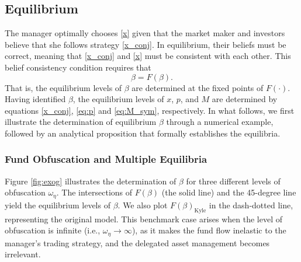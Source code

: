 \subsection{Equilibrium} \label{ss:equilibrium}
The manager optimally chooses \eqref{x} given that the market maker and investors believe that she follows strategy \eqref{x_conj}. In equilibrium, their beliefs must be correct, meaning that \eqref{x_conj} and \eqref{x} must be consistent with each other. This belief consistency condition requires that
\begin{equation}
\beta=F(\beta).\label{fixed_point}
\end{equation}
That is, the equilibrium levels of $\beta$ are determined at the fixed points of $F(\cdot)$. Having identified $\beta$, the equilibrium levels of $x$, $p$, and $M$ are determined by equations \eqref{x_conj}, \eqref{eq:p} and \eqref{eq:M_sym}, respectively. In what follows, we first illustrate the determination of equilibrium $\beta$ through a numerical example, followed by an analytical proposition that formally establishes the equilibria.


\subsubsection{Fund Obfuscation and Multiple Equilibria}


Figure \ref{fig:exog} illustrates the determination of $\beta$ for three different levels of obfuscation $\omega_{\eta}$.
The intersections of $F(\beta)$ (the solid line) and the 45-degree line yield the equilibrium levels of $\beta$. We also plot $F(\beta)_{\text{Kyle}}$ in the dash-dotted line, representing the original \citet{kyle1985continuous} model. This benchmark case arises when the level of obfuscation is infinite (i.e., $\omega_{\eta}\rightarrow \infty$), as it makes the fund flow inelastic to the manager's trading strategy, and the delegated asset management becomes irrelevant.

